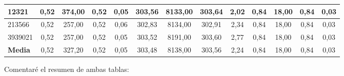 \documentclass[12pt, spanish]{article}
\begin{document}
\begin{table}[H]
\begin{adjustwidth}{-1cm}{-1cm}
\begin{tabular}{|l|c|c|c|c|c|c|c|c|c|c|c|c|}
12321                                                   & 0,52                         & 374,00                         & 0,52                      & 0,05                   & 303,56                       & 8133,00                        & 303,64                    & 2,02                   & 0,84                         & 18,00                          & 0,84                      & 0,03                   \\ \hline
213566                                                  & 0,52                         & 257,00                         & 0,52                      & 0,06                   & 302,83                       & 8134,00                        & 302,91                    & 2,34                   & 0,84                         & 18,00                          & 0,84                      & 0,03                   \\ \hline
3939021                                                 & 0,52                         & 257,00                         & 0,52                      & 0,05                   & 303,52                       & 8191,00                        & 303,60                    & 2,77                   & 0,84                         & 18,00                          & 0,84                      & 0,03                   \\ \hline
\textbf{Media}                                          & 0,52                         & 327,20                         & 0,52                      & 0,05                   & 303,48                       & 8138,00                        & 303,56                    & 2,24                   & 0,84                         & 18,00                          & 0,84                      & 0,03                   \\ \hline
\end{tabular}
\end{adjustwidth}

\end{table}

\newpage

Comentaré el resumen de ambas tablas:
\end{document}
